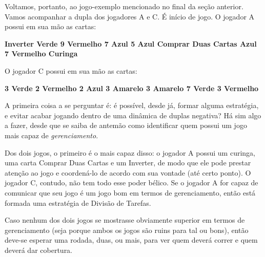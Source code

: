 Voltamos, portanto, ao jogo-exemplo mencionado no final da seção anterior. Vamos acompanhar a dupla dos jogadores A e C. É início de jogo. O jogador A possui em sua mão as cartas:

\vspace{0.5cm}

\textbf{Inverter Verde \hspace{1cm} 9 Vermelho \hspace{1cm} 7 Azul \hspace{1cm} 5 Azul \hspace{1cm} Comprar Duas Cartas Azul \hspace{1cm} 7 Vermelho \hspace{1cm} Curinga}

\vspace{0.5cm}

O jogador C possui em sua mão as cartas:

\vspace{0.5cm}

\textbf{3 Verde \hspace{1cm} 2 Vermelho \hspace{1cm} 2 Azul \hspace{1cm} 3 Amarelo \hspace{1cm} 3 Amarelo \hspace{1cm} 7 Verde \hspace{1cm} 3 Vermelho}

\vspace{0.5cm}

A primeira coisa a se perguntar é: é possível, desde já, formar alguma estratégia, e evitar acabar jogando dentro de uma dinâmica de duplas negativa? Há sim algo a fazer, desde que se saiba de antemão como identificar quem possui um jogo mais capaz de \emph{gerenciamento}.

Dos dois jogos, o primeiro é o mais capaz disso: o jogador A possui um curinga, uma carta Comprar Duas Cartas e um Inverter, de modo que ele pode prestar atenção ao jogo e coordená-lo de acordo com sua vontade (até certo ponto). O jogador C, contudo, não tem todo esse poder bélico. Se o jogador A for capaz de comunicar que seu jogo é um jogo bom em termos de gerenciamento, então está formada uma estratégia de Divisão de Tarefas.

Caso nenhum dos dois jogos se mostrasse obviamente superior em termos de gerenciamento (seja porque ambos os jogos são ruins para tal ou bons), então deve-se esperar uma rodada, duas, ou mais, para ver quem deverá correr e quem deverá dar cobertura.

